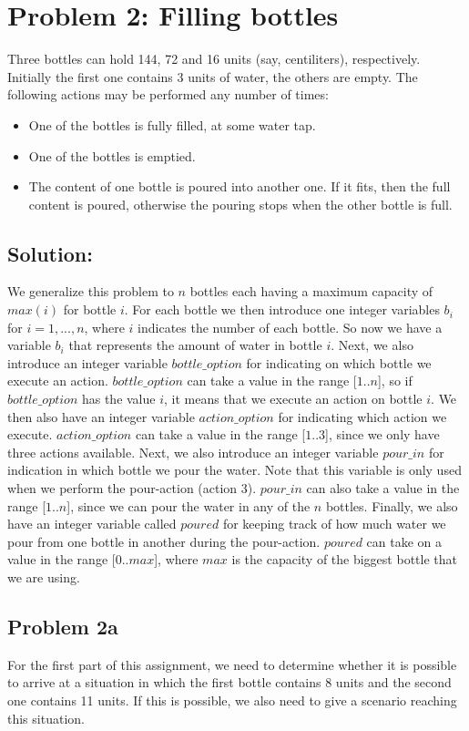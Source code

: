 \documentclass[a4paper]{article}
\begin{document}
	\section*{Problem 2: Filling bottles}
	Three bottles can hold 144, 72 and 16 units (say, centiliters), respectively. Initially the
first one contains 3 units of water, the others are empty. The following actions may be performed any number of times:
\begin{itemize}
\item One of the bottles is fully filled, at some water tap.
\item One of the bottles is emptied.
\item The content of one bottle is poured into another one. If it fits, then the full content
is poured, otherwise the pouring stops when the other bottle is full.
\end{itemize}

	\subsection*{Solution:}
	We generalize this problem to $n$ bottles each having a maximum capacity of $max(i)$ for bottle $i$. For each bottle we then introduce one integer variables $b_i$ for $i=1,...,n$, where $i$ indicates the number of each bottle. So now we have a variable $b_i$ that represents the amount of water in bottle $i$. Next, we also introduce an integer variable $bottle\_option$ for indicating on which bottle we execute an action. $bottle\_option$ can take a value in the range [$1..n$], so if $bottle\_option$ has the value $i$, it means that we execute an action on bottle $i$. We then also have an integer variable $action\_option$ for indicating which action we execute. $action\_option$ can take a value in the range [$1..3$], since we only have three actions available. Next, we also introduce an integer variable $pour\_in$ for indication in which bottle we pour the water. Note that this variable is only used when we perform the pour-action (action 3). $pour\_in$ can also take a value in the range [$1..n$], since we can pour the water in any of the $n$ bottles. Finally, we also have an integer variable called $poured$ for keeping track of how much water we pour from one bottle in another during the pour-action. $poured$ can take on a value in the range [$0..max$], where $max$ is the capacity of the biggest bottle that we are using.
	
	\subsection*{Problem 2a}
	For the first part of this assignment, we need to determine whether it is possible to arrive at a situation in which the first bottle contains 8 units and the second one contains 11 units. If this is possible, we also need to give a scenario reaching this situation.\\
	
\end{document}
